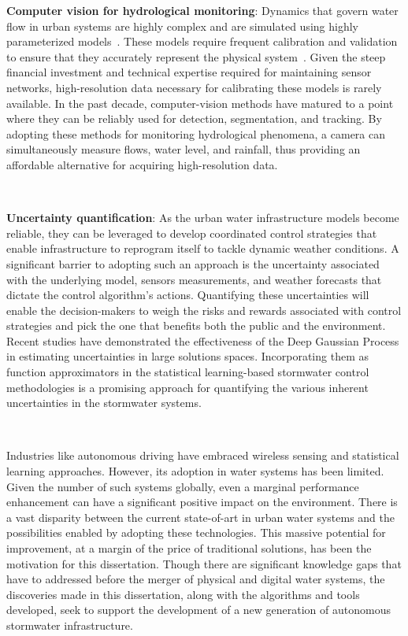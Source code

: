 \textbf{Computer vision for hydrological monitoring}: Dynamics that govern water flow in urban systems are highly complex and are simulated using highly parameterized models~\cite{Rossman2010Storm5.1}.
These models require frequent calibration and validation to ensure that they accurately represent the physical system~\cite{Rossman2010Storm5.1, national2009urban}.
Given the steep financial investment and technical expertise required for maintaining sensor networks, high-resolution data necessary for calibrating these models is rarely available\cite{kerkez2016, Bartos_2018}.
In the past decade, computer-vision methods have matured to a point where they can be reliably used for detection, segmentation, and tracking\cite{LeCun2015DeepLearning}.
By adopting these methods for monitoring hydrological phenomena, a camera can simultaneously measure flows, water level, and rainfall, thus providing an affordable alternative for acquiring high-resolution data.

\

\textbf{Uncertainty quantification}: As the urban water infrastructure models become reliable, they can be leveraged to develop coordinated control strategies that enable infrastructure to reprogram itself to tackle dynamic weather conditions\cite{Mullapudi_Lewis_Gruden_Kerkez_2020}.
A significant barrier to adopting such an approach is the uncertainty associated with the underlying model, sensors measurements, and weather forecasts that dictate the control algorithm's actions.
Quantifying these uncertainties will enable the decision-makers to weigh the risks and rewards associated with control strategies and pick the one that benefits both the public and the environment\cite{sadler2019}.
Recent studies have demonstrated the effectiveness of the Deep Gaussian Process in estimating uncertainties in large solutions spaces\cite{damianou2013deep}.
Incorporating them as function approximators in the statistical learning-based stormwater control methodologies is a promising approach for quantifying the various inherent uncertainties in the stormwater systems.

\

Industries like autonomous driving have embraced wireless sensing and statistical learning approaches.
However, its adoption in water systems has been limited. Given the number of such systems globally, even a marginal performance enhancement can have a significant positive impact on the environment.
There is a vast disparity between the current state-of-art in urban water systems and the possibilities enabled by adopting these technologies.
This massive potential for improvement, at a margin of the price of traditional solutions, has been the motivation for this dissertation.
Though there are significant knowledge gaps that have to addressed before the merger of physical and digital water systems, the discoveries made in this dissertation, along with the algorithms and tools developed, seek to support the development of a new generation of autonomous stormwater infrastructure.
